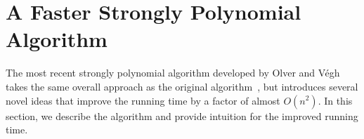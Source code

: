 \documentclass[11pt]{article}
\theoremstyle{definition}
\theoremstyle{definition}
\theoremstyle{definition}
\newcommand{\tf}{\textsc{Tight-Flow}}
\newcommand{\filtration}{\textsc{De-Isolation}}
\renewcommand{\todo}[1]{\hl{TODO: #1}}
\begin{document}
	
    
	


\section{A Faster Strongly Polynomial Algorithm}\label{sec:2017}

The most recent strongly polynomial algorithm developed by Olver and Végh
\cite{Olver2017} takes the same overall approach as the original
algorithm~\cite{Vegh2013}, but introduces several novel ideas that improve the running time by a factor of almost $O(n^2)$. 
In this section, we describe the algorithm and provide intuition for the
improved running time.
\end{document}
